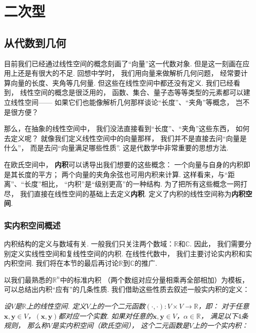 \clearpage

\section{二次型}

\subsection{从代数到几何}

目前我们已经通过线性空间的概念刻画了“向量”这一代数对象.
但是这一刻画在应用上还是有很大的不足.
回想中学时，
我们用向量来做解析几何问题，
经常要计算向量的长度、夹角等几何量.
但这些在线性空间中都还没有定义.
我们已经看到，
线性空间的概念是很泛用的，
函数、集合、量子态等等类型的元素都可以建立线性空间——
如果它们也能像解析几何那样谈论“长度”、“夹角”等概念，
岂不是很方便？

那么，在抽象的线性空间中，
我们没法直接看到“长度”、“夹角”这些东西，
如何去定义呢？
就像我们定义线性空间中的向量那样，
我们并不是直接去问“向量是什么”，
而是去问“向量满足哪些性质”.
这是代数学中非常重要的思想方法.

在欧氏空间中，
\textbf{内积}可以诱导出我们想要的这些概念：
一个向量与自身的内积即是其长度的平方；
两个向量的夹角余弦也可用内积来计算.
这样看来，与“距离”、“长度”相比，
“内积”是“级别更高”的一种结构.
为了把所有这些概念一网打尽，
我们直接在线性空间的基础上去定义\textbf{内积}.
定义了内积的线性空间称为\textbf{内积空间}.

\subsubsection{实内积空间概述}

内积结构的定义与数域有关.
一般我们只关注两个数域：$\mathbb{R}$和$\mathbb{C}$.
因此，
我们需要分别定义实线性空间和复线性空间的内积.
在线性代数中，
我们主要讨论实内积和实内积空间.
我们将在本节的最后再讨论$\mathbb{R}$到$\mathbb{C}$的推广.

\bigskip


以我们最熟悉的$\mathbb{R}^n$中的标准内积
（两个数组对应分量相乘再全部相加）为模板，
可以总结出内积“应有”的几条性质.
我们借助这些性质去叙述一般实内积的定义：

\medskip

\textit{设$V$是$\mathbb{R}$上的线性空间.
定义$V$上的一个二元函数$(\cdot,\cdot) : V \times V \to \mathbb{R}$，即：
对于任意$\bm{x},\bm{y} \in V$，$(\bm{x},\bm{y})$都对应一个实数.
如果对任意的$\bm{x},\bm{y} \in V$，$\alpha \in \mathbb{R}$，
满足以下$4$条规则，
那么称$V$是实内积空间（欧氏空间），
这个二元函数是$V$上的一个实内积：}

